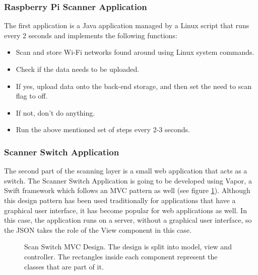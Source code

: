 \subsubsection{Raspberry Pi Scanner Application}
The first application is a Java application managed by a Linux script that runs every 2 seconds and implements the following functions:
\begin{itemize}
    \item Scan and store Wi-Fi networks found around using Linux system commands.
    \item Check if the data needs to be uploaded.
    \item If yes, upload data onto the back-end storage, and then set the need to scan flag to off.
    \item If not, don't do anything.
    \item Run the above mentioned set of steps every 2-3 seconds.
\end{itemize}

\subsubsection{Scanner Switch Application}

The second part of the scanning layer is a small web application that acts as a switch. The Scanner Switch Application is going to be developed using Vapor, a Swift framework which follows an MVC pattern as well (see figure \ref{fig:scan-switch-mvc}). Although this design pattern has been used traditionally for applications that have a graphical user interface, it has become popular for web applications as well. In this case, the application runs on a server, without a graphical user interface, so the JSON takes the role of the View component in this case.

\begin{figure}[H]
    \centering
    \centering
    \caption{Scan Switch MVC Design. The design is split into model, view and controller. The rectangles inside each component represent the classes that are part of it.}
\label{fig:scan-switch-mvc}
\end{figure}


